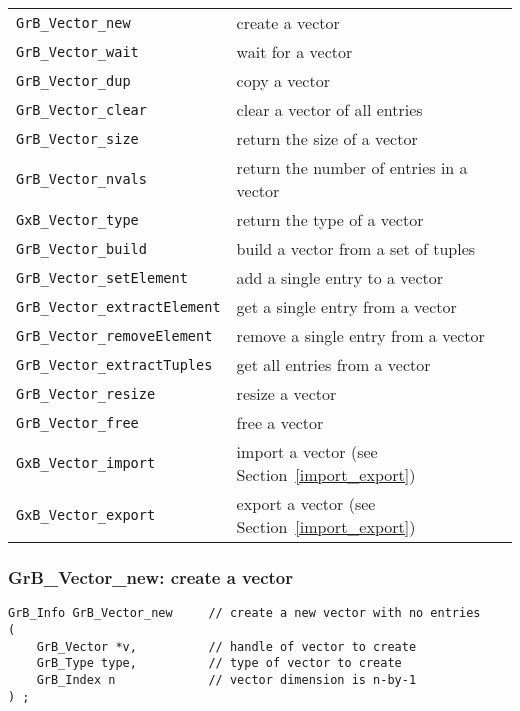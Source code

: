 \documentclass[12pt]{article}
\begin{document}
\vspace{0.2in}
{\footnotesize
\begin{tabular}{ll}
\hline
\verb'GrB_Vector_new'            & create a vector \\
\verb'GrB_Vector_wait'           & wait for a vector \\
\verb'GrB_Vector_dup'            & copy a vector \\
\verb'GrB_Vector_clear'          & clear a vector of all entries \\
\verb'GrB_Vector_size'           & return the size of a vector \\
\verb'GrB_Vector_nvals'          & return the number of entries in a vector \\
\verb'GxB_Vector_type'           & return the type of a vector \\
\verb'GrB_Vector_build'          & build a vector from a set of tuples \\
\verb'GrB_Vector_setElement'     & add a single entry to a vector \\
\verb'GrB_Vector_extractElement' & get a single entry from a vector \\
\verb'GrB_Vector_removeElement'  & remove a single entry from a vector \\
\verb'GrB_Vector_extractTuples'  & get all entries from a vector \\
\verb'GrB_Vector_resize'         & resize a vector \\
\verb'GrB_Vector_free'           & free a vector \\
\hline
\verb'GxB_Vector_import'         & import a vector
                                    (see Section~\ref{import_export})\\
\verb'GxB_Vector_export'         & export a vector
                                    (see Section~\ref{import_export})\\
\hline
\end{tabular}
}


\newpage
\subsubsection{{\sf GrB\_Vector\_new:}           create a vector}
\label{vector_new}

\begin{mdframed}[userdefinedwidth=6in]
{\footnotesize
\begin{verbatim}
GrB_Info GrB_Vector_new     // create a new vector with no entries
(
    GrB_Vector *v,          // handle of vector to create
    GrB_Type type,          // type of vector to create
    GrB_Index n             // vector dimension is n-by-1
) ;
\end{verbatim}
} \end{mdframed}
\end{document}
